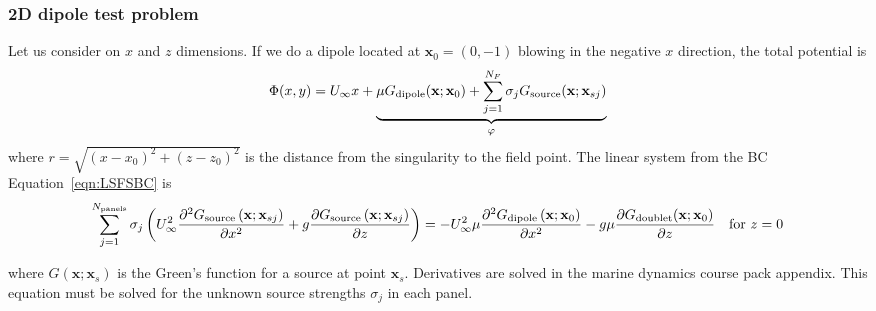 \documentclass[10pt]{article}
\newcommand{\pp}[2]{\frac{\partial #1}{\partial #2}}
\newcommand{\ppt}[2]{\frac{\partial^2 #1}{\partial #2^2}}
\newcommand{\mbf}[1]{\mathbf{#1}}
\newcommand{\be}{\begin{eqnarray}}
\newcommand{\ee}{\end{eqnarray}}
\newcommand{\beq}{\begin{equation}
    \begin{aligned}
        }
\newcommand{\eeq}{\end{aligned}
\end{equation}
}
\newcommand{\Uinf}{U_{\infty}}
\newcommand{\tn}[1]{\textnormal{#1}}
\begin{document}
% 

\subsubsection{2D dipole test problem}
Let us consider on $x$ and $z$ dimensions.
If we do a dipole located at $\mbf{x}_0=(0,-1)$ blowing in the negative $x$ direction, the total potential is
\be
\label{eqn:MovingDipole}
\Phi(x,y) = \Uinf x
+
\underbrace{
    \mu G_{\tn{dipole}}(\mbf{x}; \mbf{x}_0)
    +
    \sum_{j=1}^{N_F} {\sigma_j} G_{\tn{source}}(\mbf{x}; \mbf{x}_{sj})
}_{\varphi}
\ee
where $r=\sqrt{(x-x_0)^2 + (z- z_0)^2}$ is the distance from the singularity to the field point.
The linear system from the BC Equation~\eqref{eqn:LSFSBC} is
\beq
\sum_{j=1}^{N_{\tn{panels}}}
\sigma_j
\left(
\Uinf^2
\ppt{G_{\tn{source}}\left(\mbf{x}; \mbf{x}_{sj}\right)}{x}
+ g\pp{G_{\tn{source}}\left(\mbf{x}; \mbf{x}_{sj}\right)}{z}
\right)
=
-\Uinf^2 \mu
\ppt{G_{\tn{dipole}}\left(\mbf{x}; \mbf{x}_0\right)}{x}
- g \mu
\pp{G_{\tn{doublet}}(\mbf{x}; \mbf{x}_0)}{z}
\quad \tn{for } z = 0
\eeq
where $G\left(\mbf{x}; \mbf{x}_s\right)$ is the Green's function for a source at point $\mbf{x}_s$.
Derivatives are solved in the marine dynamics course pack appendix.
This equation must be solved for the unknown source strengths $\sigma_j$ in each panel.
\end{document}
